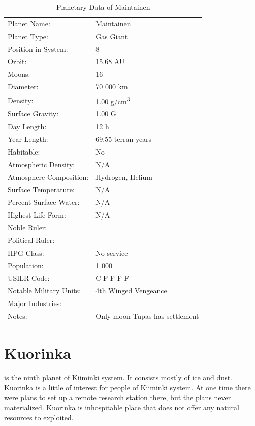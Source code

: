 \documentclass{tufte-book}
\begin{document}
\bigskip
\begin{table}
\begin{minipage}{\textwidth}
\begin{center}
\begin{tabular}{ll}
\toprule
Planet Name: & Maintainen \\
Planet Type: & Gas Giant \\
Position in System: & 8 \\
Orbit: & 15.68 AU \\
Moons: & 16 \\
Diameter: & 70 000 km \\
Density: & 1.00 g/cm\textsuperscript{3} \\
Surface Gravity: & 1.00 G \\
Day Length: & 12 h \\
Year Length: & 69.55 terran years \\
Habitable: & No \\
\quad Atmospheric Density: & N/A \\
\quad Atmosphere Composition: & Hydrogen, Helium \\
\quad Surface Temperature: & N/A \\
\quad Percent Surface Water: & N/A \\
\quad Highest Life Form: & N/A \\
\toprule
Noble Ruler: & \\
Political Ruler: & \\
HPG Class: & No service \\
Population: & 1 000 \\
USILR Code: & C-F-F-F-F \\
Notable Military Units: & 4th Winged Vengeance \\
Major Industries: & \\
Notes: & Only moon Tupas has settlement \\


\bottomrule
\end{tabular}
\end{center}
\end{minipage}
\caption{Planetary Data of Maintainen}
\end{table}


\section{Kuorinka}

 is the ninth planet of Kiiminki system. It consists
mostly of ice and dust. Kuorinka is a little of interest for people of
Kiiminki system. At one time there were plans to set up a remote research
station there, but the plans never materialized. Kuorinka is inhospitable
place that does not offer any natural resources to exploited.
\end{document}

